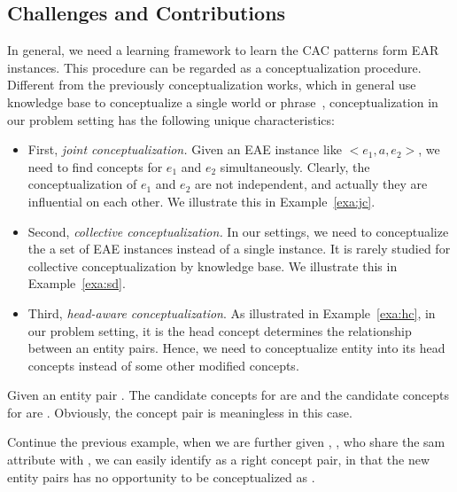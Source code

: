 \subsection{Challenges and Contributions}

In general, we need a learning framework to learn the CAC patterns form EAR instances.
This procedure can be regarded as a conceptualization procedure.
Different from the previously conceptualization works, which in general use knowledge base to conceptualize a single world or phrase~\cite{song2011short,kim2013context}, conceptualization in our problem setting has the following unique characteristics:
\begin{itemize}
\item First,  {\it joint conceptualization.} Given an EAE instance like $<e_1, a, e_2>$, we need to find concepts for $e_1$ and $e_2$ simultaneously. Clearly, the conceptualization of $e_1$ and $e_2$ are not independent, and actually they are influential on each other. We illustrate this in Example~\ref{exa:jc}.
\item Second, {\it collective conceptualization.} 
In our settings, we need to conceptualize the a set of EAE instances instead of a single instance. It is rarely studied for collective conceptualization by knowledge base. We illustrate this in Example~\ref{exa:sd}.
\item Third, {\it head-aware conceptualization}. As illustrated in Example~\ref{exa:hc}, in our problem setting, it is the head concept determines the relationship between an entity pairs. Hence, we need to conceptualize entity into its head concepts instead of some other modified concepts. 
\end{itemize}

\begin{example}
Given an entity pair . The candidate concepts for  are  and the candidate concepts for  are . Obviously, the concept pair  is meaningless in this case.
\label{exa:jc}
\end{example}


\begin{example}
Continue the previous example, when we are further given , , who share the sam attribute  with , we can easily identify  as a right concept pair, in that the new entity pairs has no opportunity to be conceptualized as .
\label{exa:sd}
\end{example}

